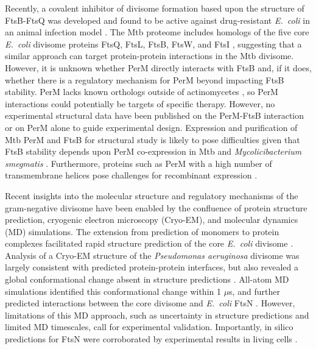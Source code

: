 \documentclass[twocolumn,pdflatex,sn-nature]{sn-jnl}%
\newcommand\ec{\textit{E.~coli}}
\newcommand\mtb{Mtb}
\newcommand\msmegfull{\textit{Mycolicibacterium smegmatis}}
\newcommand\pafull{\textit{Pseudomonas aeruginosa}}
\begin{document}
Recently, a covalent inhibitor of divisome formation based upon the structure of FtsB-FtsQ was developed and found to be active against drug-resistant \ec{} in an animal infection model \citep{paulussenCovalentProteomimeticInhibitor2022}. The \mtb{} proteome includes homologs of the five core \ec{} divisome proteins FtsQ, FtsL, FtsB, FtsW, and FtsI \citep{wuCharacterizationConservedNovel2018}, suggesting that a similar approach can target protein-protein interactions in the \mtb{} divisome. However, it is unknown whether PerM directly interacts with FtsB  \citep{wangPersistentMycobacteriumTuberculosis2019} and, if it does, whether there is a regulatory mechanism for PerM beyond impacting FtsB stability. PerM lacks known orthologs outside of actinomycetes \citep{goodsmithDisruptionTuberculosisMembrane2015}, so PerM interactions could potentially be targets of specific therapy. However, no experimental structural data have been published on the PerM-FtsB interaction or on PerM alone to guide experimental design. Expression and purification of \mtb{} PerM and FtsB for structural study is likely to pose difficulties given that FtsB stability depends upon PerM co-expression in \mtb{} and \msmegfull{} \citep{wangPersistentMycobacteriumTuberculosis2019}. Furthermore, proteins such as PerM with a high number of transmembrane helices pose challenges for recombinant expression \citep{graveHighthroughputStrategyIdentification2022, korepanovaCloningExpressionMultiple2005}.

Recent insights into the molecular structure and regulatory mechanisms of the gram-negative divisome have been enabled by the confluence of protein structure prediction, cryogenic electron microscopy (Cryo-EM), and molecular dynamics (MD) simulations. The extension from prediction of monomers to protein complexes \citep{baekAccuratePredictionProtein2021, evansProteinComplexPrediction2022} facilitated rapid structure prediction of the core \ec{} divisome \citep{attaibiUpdatedModelDivisome2022, cravenModelInteractionsFtsQLB2022}. Analysis of a Cryo-EM structure of the \pafull{} divisome was largely consistent with predicted protein-protein interfaces, but also revealed a global conformational change absent in structure predictions \citep{kashammerCryoEMStructureBacterial2023}. All-atom MD simulations identified this conformational change within 1 $\mu$s, and further predicted interactions between the core divisome and \ec{} FtsN \citep{brittonConformationalChangesEssential2023}. However, limitations of this MD approach, such as uncertainty in structure predictions and limited MD timescales, call for experimental validation. Importantly, in silico predictions for FtsN were corroborated by experimental results in living cells \citep{parkEssentialDomainFtsN2023}.
\end{document}
